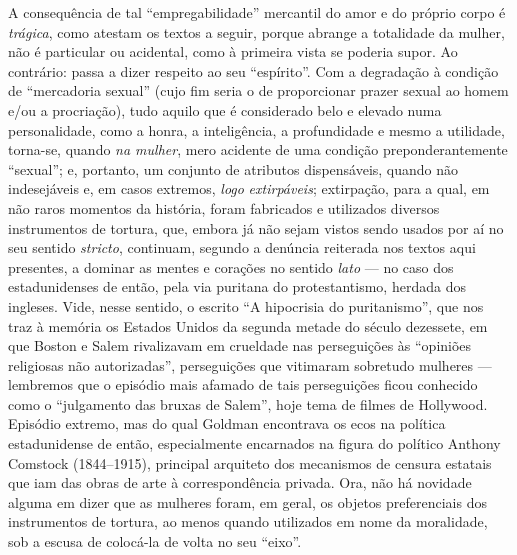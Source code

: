 A consequência de tal ``empregabilidade'' mercantil do amor e do próprio
corpo é \emph{trágica}, como atestam os textos a seguir, porque abrange
a totalidade da mulher, não é particular ou acidental, como à primeira
vista se poderia supor. Ao contrário: passa a dizer respeito ao seu
``espírito''. Com a degradação à condição de ``mercadoria sexual'' (cujo
fim seria o de proporcionar prazer sexual ao homem e/ou a procriação),
tudo aquilo que é considerado belo e elevado numa personalidade, como a
honra, a inteligência, a profundidade e mesmo a utilidade, torna-se,
quando \emph{na mulher}, mero acidente de uma condição
preponderantemente ``sexual''; e, portanto, um conjunto de atributos
dispensáveis, quando não indesejáveis e, em casos extremos, \emph{logo}
\emph{extirpáveis}; extirpação, para a qual, em não raros momentos da
história, foram fabricados e utilizados diversos instrumentos de
tortura, que, embora já não sejam vistos sendo usados por aí no seu
sentido \emph{stricto}, continuam, segundo a denúncia reiterada nos
textos aqui presentes, a dominar as mentes e corações no sentido
\emph{lato} --- no caso dos estadunidenses de então, pela via puritana do
protestantismo, herdada dos ingleses. Vide, nesse sentido, o escrito ``A
hipocrisia do puritanismo'', que nos traz à memória os Estados Unidos da
segunda metade do século dezessete, em que Boston e Salem rivalizavam em
crueldade nas perseguições às ``opiniões religiosas não autorizadas'',
perseguições que vitimaram sobretudo mulheres --- lembremos que o
episódio mais afamado de tais perseguições ficou conhecido como o
``julgamento das bruxas de Salem'', hoje tema de filmes de Hollywood.
Episódio extremo, mas do qual Goldman encontrava os ecos na política
estadunidense de então, especialmente encarnados na figura do político
Anthony Comstock (1844--1915), principal arquiteto dos mecanismos de
censura estatais que iam das obras de arte à correspondência privada.
Ora, não há novidade alguma em dizer que as mulheres foram, em geral, os
objetos preferenciais dos instrumentos de tortura, ao menos quando
utilizados em nome da moralidade, sob a escusa de colocá-la de volta no
seu ``eixo''.

